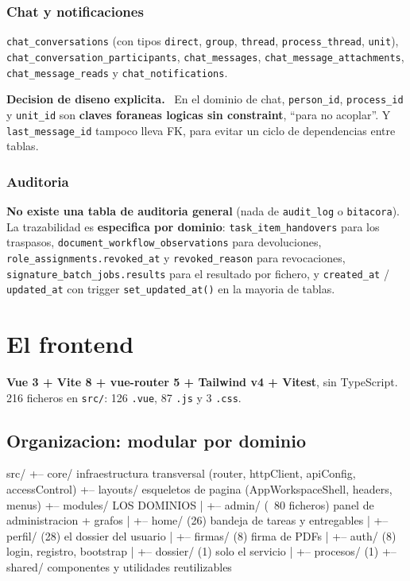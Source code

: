 \documentclass[11pt,a4paper,oneside]{report}
\newenvironment{nota}[1][Nota]{%
  \par\medskip
  \colorlet{shadecolor}{black!6}%
  \begin{shaded}\noindent\textbf{#1.}\ \ignorespaces}%
  {\end{shaded}\par\medskip}
\newcommand{\rt}[1]{\texttt{#1}}
\begin{document}
\subsection{Chat y notificaciones}
\rt{chat\_conversations} (con tipos \rt{direct}, \rt{group}, \rt{thread}, \rt{process\_thread},
\rt{unit}), \rt{chat\_conversation\_participants}, \rt{chat\_messages},
\rt{chat\_message\_attachments}, \rt{chat\_message\_reads} y \rt{chat\_notifications}.

\begin{nota}[Decision de diseno explicita]
En el dominio de chat, \rt{person\_id}, \rt{process\_id} y \rt{unit\_id} son \textbf{claves
foraneas logicas sin constraint}, ``para no acoplar''. Y \rt{last\_message\_id} tampoco lleva FK,
para evitar un ciclo de dependencias entre tablas.
\end{nota}

\subsection{Auditoria}
\textbf{No existe una tabla de auditoria general} (nada de \rt{audit\_log} o \rt{bitacora}). La
trazabilidad es \textbf{especifica por dominio}: \rt{task\_item\_handovers} para los traspasos,
\rt{document\_workflow\_observations} para devoluciones, \rt{role\_assignments.revoked\_at} y
\rt{revoked\_reason} para revocaciones, \rt{signature\_batch\_jobs.results} para el resultado
por fichero, y \rt{created\_at} / \rt{updated\_at} con trigger \rt{set\_updated\_at()} en la
mayoria de tablas.

\chapter{El frontend}

\textbf{Vue 3 + Vite 8 + vue-router 5 + Tailwind v4 + Vitest}, sin TypeScript. 216 ficheros
en \rt{src/}: 126 \rt{.vue}, 87 \rt{.js} y 3 \rt{.css}.

\section{Organizacion: modular por dominio}

\begin{diagrama}
src/
+-- core/       infraestructura transversal (router, httpClient, apiConfig, accessControl)
+-- layouts/    esqueletos de pagina (AppWorkspaceShell, headers, menus)
+-- modules/    LOS DOMINIOS
|   +-- admin/     (~80 ficheros)  panel de administracion + grafos
|   +-- home/      (26)            bandeja de tareas y entregables
|   +-- perfil/    (28)            el dossier del usuario
|   +-- firmas/    (8)             firma de PDFs
|   +-- auth/      (8)             login, registro, bootstrap
|   +-- dossier/   (1)             solo el servicio
|   +-- procesos/  (1)
+-- shared/     componentes y utilidades reutilizables
\end{diagrama}
\end{document}
